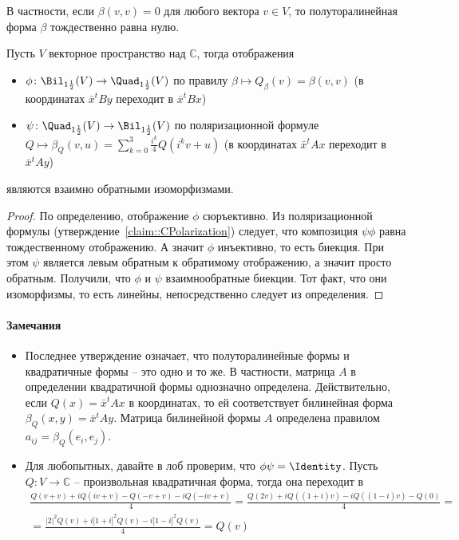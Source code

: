 В частности, если $\beta(v, v) = 0$ для любого вектора $v\in V$, то полуторалинейная форма $\beta$ тождественно равна нулю.

\begin{claim}
\label{claim::CBilQuad}
Пусть $V$ векторное пространство над $\mathbb C$, тогда отображения
\begin{itemize}
\item $\phi\colon\Bil_{1\frac{1}{2}}(V)\to \Quad_{1\frac{1}{2}}(V)$ по правилу $\beta\mapsto Q_\beta(v) = \beta(v,v)$ (в координатах $\bar x^t B y$ переходит в $\bar x^t B x$)

\item $\psi\colon\Quad_{1\frac{1}{2}}(V)\to \Bil_{1\frac{1}{2}}(V)$ по поляризационной формуле $Q\mapsto \beta_Q(v,u) = \sum_{k=0}^3 \frac{i^k}{4}Q(i^k v + u)$ (в координатах $\bar x^t A x$ переходит в $\bar x^t A y$)
\end{itemize}
являются взаимно обратными изоморфизмами.
\end{claim}
\begin{proof}
По определению, отображение $\phi$ сюръективно.
Из поляризационной формулы (утверждение~\ref{claim::CPolarization}) следует, что композиция $\psi\phi$ равна тождественному отображению.
А значит $\phi$ инъективно, то есть биекция.
При этом $\psi$ является левым обратным к обратимому отображению, а значит просто обратным.
Получили, что $\phi$ и $\psi$ взаимнообратные биекции.
Тот факт, что они изоморфизмы, то есть линейны, непосредственно следует из определения.
\end{proof}

\paragraph{Замечания}

\begin{itemize}
\item Последнее утверждение означает, что полуторалинейные формы и квадратичные формы -- это одно и то же.
В частности, матрица $A$ в определении квадратичной формы однозначно определена.
Действительно, если $Q(x) = \bar x^t A x$ в координатах, то ей соответствует билинейная форма $\beta_Q(x, y) = \bar x^t A y$.
Матрица билинейной формы $A$ определена правилом $a_{ij} = \beta_Q(e_i, e_j)$.

\item Для любопытных, давайте в лоб проверим, что $\phi\psi = \Identity$.
Пусть $Q\colon V\to \mathbb C$ -- произвольная квадратичная форма, тогда она переходит в
\begin{gather*}
\frac{Q(v+v) + iQ(iv+v) - Q(-v+v) -i Q(-iv + v)}{4} = \frac{Q(2v) + iQ((1+i)v) - i Q((1-i)v) - Q(0)}{4} =\\ =\frac{|2|^2 Q(v)+i|1+i|^2Q(v) - i|1-i|^2Q(v)}{4} = Q(v)
\end{gather*}
\end{itemize}

